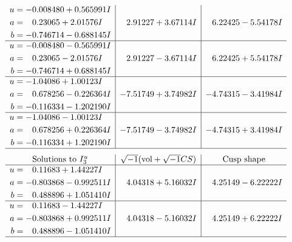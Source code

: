 \documentclass[1p]{elsarticle_modified}
\theoremstyle{definition}
\newcommand{\I}{\sqrt{-1}}
\begin{document}
$$\begin{array}{c|c|c}
\begin{aligned}
u &= -0.008480 + 0.565991 I \\
a &= \phantom{-}0.23065 + 2.01576 I \\
b &= -0.746714 - 0.688145 I\end{aligned}
 & \phantom{-}2.91227 + 3.67114 I & \phantom{-}6.22425 - 5.54178 I \\ \hline\begin{aligned}
u &= -0.008480 - 0.565991 I \\
a &= \phantom{-}0.23065 - 2.01576 I \\
b &= -0.746714 + 0.688145 I\end{aligned}
 & \phantom{-}2.91227 - 3.67114 I & \phantom{-}6.22425 + 5.54178 I \\ \hline\begin{aligned}
u &= -1.04086 + 1.00123 I \\
a &= \phantom{-}0.678256 - 0.226364 I \\
b &= -0.116334 - 1.202190 I\end{aligned}
 & -7.51749 + 3.74982 I & -4.74315 - 3.41984 I \\ \hline\begin{aligned}
u &= -1.04086 - 1.00123 I \\
a &= \phantom{-}0.678256 + 0.226364 I \\
b &= -0.116334 + 1.202190 I\end{aligned}
 & -7.51749 - 3.74982 I & -4.74315 + 3.41984 I\\
 \hline 
 \end{array}$$\newpage$$\begin{array}{c|c|c}  
\text{Solutions to }I^u_{3}& \I (\text{vol} + \sqrt{-1}CS) & \text{Cusp shape}\\
 \hline 
\begin{aligned}
u &= \phantom{-}0.11683 + 1.44227 I \\
a &= -0.803868 - 0.992511 I \\
b &= \phantom{-}0.488896 + 1.051410 I\end{aligned}
 & \phantom{-}4.04318 + 5.16032 I & \phantom{-}4.25149 - 6.22222 I \\ \hline\begin{aligned}
u &= \phantom{-}0.11683 - 1.44227 I \\
a &= -0.803868 + 0.992511 I \\
b &= \phantom{-}0.488896 - 1.051410 I\end{aligned}
 & \phantom{-}4.04318 - 5.16032 I & \phantom{-}4.25149 + 6.22222 I\\
 \hline 
 \end{array}$$\newpage\newpage\renewcommand{\arraystretch}{1}
\end{document}
